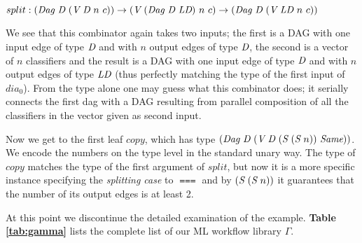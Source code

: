 \documentclass{ws-ijait}
\begin{document}
$split : (\textit{Dag}\ \textit{D}\ (\textit{V}\ \textit{D}\ n\ c)) \rightarrow (\textit{V}\ (\textit{Dag}\ \textit{D}\ \textit{LD})\ n\ c) \rightarrow (\textit{Dag}\ \textit{D}\ (\textit{V}\ \textit{LD}\ n\ c))$

We see that this combinator again takes two inputs; 
the first is a DAG with one input edge of type $\textit{D}$ and with $n$ output edges of type $\textit{D}$,
the second is a vector of $n$ classifiers
and the result is a DAG with one input edge of type $\textit{D}$ and with $n$ output edges of type $\textit{LD}$ 
(thus perfectly matching the type of the first input of $dia_0$).
From the type alone one may guess what this combinator does; it serially connects the first dag
with a DAG resulting from parallel composition of all the classifiers in the vector given as second input.

Now we get to the first leaf $copy$, which has type $(\textit{Dag}\ \textit{D}\ (\textit{V}\ \textit{D}\ (\textit{S}\ (\textit{S}\ n))\ \textit{Same}))$. We encode the numbers on the type level in the standard unary way. The type of $copy$ matches the type of the first argument of $split$, but now it is a more specific instance specifying the \textit{splitting case} to $\Same$ and by $(\textit{S}\ (\textit{S}\ n))$ it guarantees that the number of its output edges is at least 2.      

At this point we discontinue the detailed examination of the example. \textbf{Table \ref{tab:gamma}} lists the complete list of our ML workflow library $\Gamma$.
\end{document}
